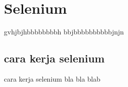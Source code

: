 \section{Selenium}


gvhjbjhbbbbbbbbh
bbjbbbbbbbbbbjnjn\cite{murray1993synthesis}


\subsection{cara kerja selenium}
cara kerja selenium bla bla blab\cite{pedregosa2011scikit}